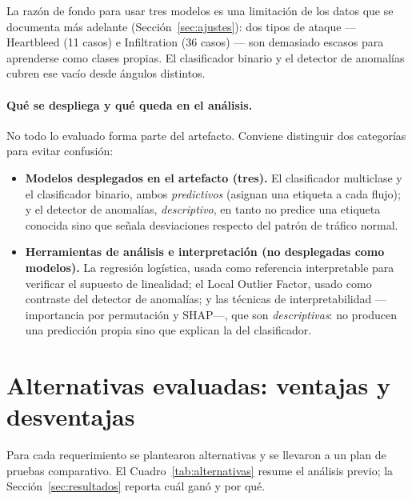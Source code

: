 \documentclass[11pt,a4paper]{article}
\begin{document}
La razón de fondo para usar tres modelos es una limitación de los datos que
se documenta más adelante (Sección~\ref{sec:ajustes}): dos tipos de ataque
--- Heartbleed (11 casos) e Infiltration (36 casos) --- son demasiado escasos
para aprenderse como clases propias. El clasificador binario y el detector de
anomalías cubren ese vacío desde ángulos distintos.

\paragraph{Qué se despliega y qué queda en el análisis.}
No todo lo evaluado forma parte del artefacto. Conviene distinguir dos
categorías para evitar confusión:

\begin{itemize}
\item \textbf{Modelos desplegados en el artefacto (tres).} El clasificador
multiclase y el clasificador binario, ambos \emph{predictivos} (asignan una
etiqueta a cada flujo); y el detector de anomalías, \emph{descriptivo}, en
tanto no predice una etiqueta conocida sino que señala desviaciones respecto
del patrón de tráfico normal.
\item \textbf{Herramientas de análisis e interpretación (no desplegadas como
modelos).} La regresión logística, usada como referencia interpretable para
verificar el supuesto de linealidad; el Local Outlier Factor, usado como
contraste del detector de anomalías; y las técnicas de interpretabilidad
---importancia por permutación y SHAP---, que son \emph{descriptivas}: no
producen una predicción propia sino que explican la del clasificador.
\end{itemize}

\section{Alternativas evaluadas: ventajas y desventajas}

Para cada requerimiento se plantearon alternativas y se llevaron a un plan de
pruebas comparativo. El Cuadro~\ref{tab:alternativas} resume el análisis
previo; la Sección~\ref{sec:resultados} reporta cuál ganó y por qué.
\end{document}
